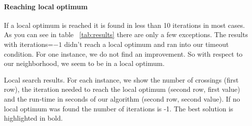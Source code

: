 \documentclass{scrartcl}
\begin{document}
\paragraph{Reaching local optimum}
If a local optimum is reached it is found in less than 10 iterations
in most cases.  As you can see in table ~\ref{tab:results} there are
only a few exceptions.  The results with iterations=$-1$ didn't reach
a local optimum and ran into our timeout condition. For one instance,
we do not find an improvement. So with respect to our neighborhood, we
seem to be in a local optimum.









\begin{landscape}
\begin{table}
  \scriptsize
  
\caption{Local search results. For each instance, we show the number
  of crossings (first row), the iteration needed to reach the local
  optimum (second row, first value) and the run-time in seconds of our
  algorithm (second row, second value).  If no local optimum was found
  the number of iterations is -1. The best solution is highlighted in
  bold.}
\label{tab:results}
\end{table}
\end{landscape}
\end{document}
